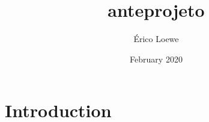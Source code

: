 \documentclass{article}
\title{anteprojeto}
\author{Érico Loewe}
\date{February 2020}
\begin{document}
\maketitle

\section{Introduction}
\end{document}
